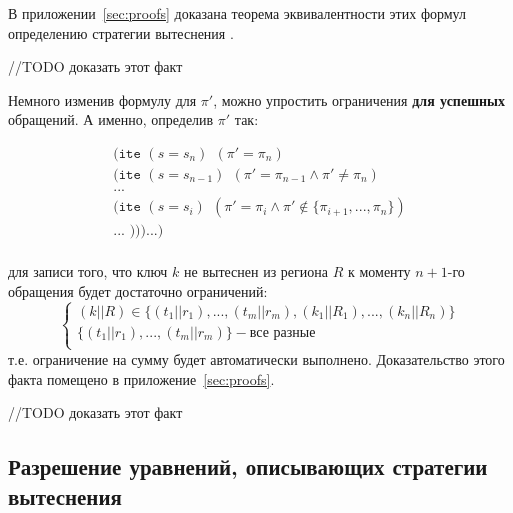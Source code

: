 
В приложении~\ref{sec:proofs} доказана теорема эквивалентности этих формул определению стратегии вытеснения \PseudoLRU.

//TODO доказать этот факт

Немного изменив формулу для $\pi'$, можно упростить ограничения \textbf{для успешных} обращений. А именно, определив $\pi'$ так:

$$
\begin{array}{l}
\texttt{(ite~} (s = s_n) ~~ (\pi' = \pi_n)\\
\texttt{(ite~} (s = s_{n-1}) ~~ (\pi' = \pi_{n-1} \wedge \pi' \neq \pi_n)\\
...\\
\texttt{(ite~} (s = s_i) ~~ (\pi' = \pi_i \wedge \pi' \notin \{\pi_{i+1}, ..., \pi_n\})\\
... \texttt{~)))...)}\\
\end{array}
$$

для записи того, что ключ $k$ не вытеснен из региона $R$ к моменту $n+1$-го обращения будет достаточно ограничений:
$$
\left\{\begin{array}{l}
(k||R) \in \{(t_1||r_1), ..., (t_m||r_m), (k_1||R_1), ..., (k_n||R_n)\}\\
\{(t_1||r_1), ..., (t_m||r_m)\} - \mbox{все разные}\\
\end{array} \right.
$$
т.е. ограничение на сумму будет автоматически выполнено. Доказательство этого факта помещено в приложение~\ref{sec:proofs}.

//TODO доказать этот факт

\subsection{Разрешение уравнений, описывающих стратегии вытеснения}

